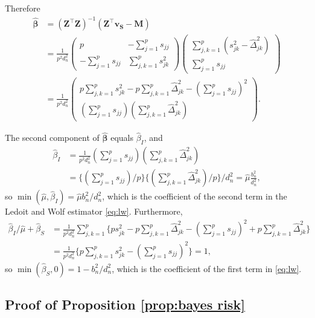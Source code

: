 \documentclass{article}
\def\bs{\mathbf}
\begin{document}
Therefore
\begin{align*}
\hat{\bs{\beta}}& = (\bs{Z}^\top \bs{Z})^{-1}(\bs{Z^\top \bs{v_S}}-\bs{M} ) \\
&= \frac{1}{p^2d_n^2}\begin{pmatrix}
p & -\sum_{j=1}^p s_{jj}\\
-\sum_{j=1}^p s_{jj} & \sum_{j,k=1}^ps_{jk}^2
\end{pmatrix}\begin{pmatrix}
\sum_{j,k=1}^p(s_{jk}^2 - \hat{\Delta}_{jk}^2)\\
\sum_{j=1}^p s_{jj}
\end{pmatrix}\\
&= \frac{1}{p^2d_n^2}\begin{pmatrix}
 p\sum_{j,k=1}^p s_{jk}^2 -p\sum_{j,k=1}^p\hat{\Delta}_{jk}^2-(\sum_{j=1}^ps_{jj})^2\\
 (\sum_{j=1}^ps_{jj}) (\sum_{j,k=1}^p\hat{\Delta}_{jk}^2)
\end{pmatrix}.
\end{align*}

The second component of $\hat{\bs{\beta}}$ equals $\hat{\beta}_I$, and
\begin{align*}
\hat{\beta}_I &= \frac{1}{p^2d_n^2} (\sum_{j=1}^ps_{jj}) (\sum_{j,k=1}^p\hat{\Delta}_{jk}^2)\\
&=\{(\sum_{j=1}^ps_{jj})/p\}   \{(\sum_{j,k=1}^p\hat{\Delta}_{jk}^2)/p \} / d_n^2
=\hat{\mu}\frac{b_n^2}{d_n^2},
\end{align*}
so $\min(\hat{\mu}, \hat{\beta}_I) = \hat{\mu} b_n^2 / d_n^2$, which is the coefficient of the second term in the Ledoit and Wolf estimator \eqref{eq:lw}. Furthermore,
\begin{align*}
\hat{\beta}_I /\hat{\mu} + \hat{\beta}_S &= \frac{1}{p^2d_n^2}\sum_{j,k=1}^p \{ps_{jk}^2 -p\sum_{j,k=1}^p\hat{\Delta}_{jk}^2-(\sum_{j=1}^ps_{jj})^2+p\sum_{j,k=1}^p\hat{\Delta}_{jk}^2\}\\
&=\frac{1}{p^2d_n^2}\{p\sum_{j,k=1}^p s_{jk}^2 -(\sum_{j=1}^ps_{jj})^2\}
=
1,
\end{align*}
so $\min(\hat{\beta}_S, 0) = 1 - b_n^2 / d_n^2$, which is the coefficient of the first term in \eqref{eq:lw}.

\subsection{Proof of Proposition \ref{prop:bayes risk}}
\end{document}
